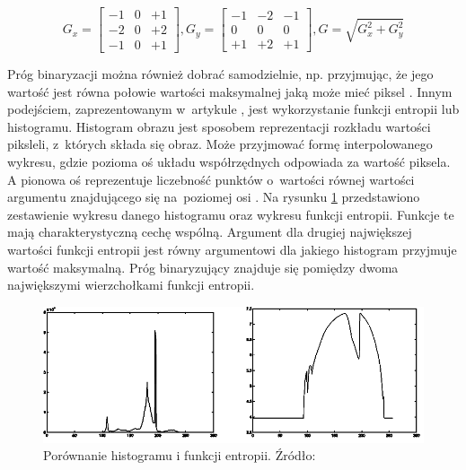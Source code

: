 \begin{equation}
G_{x} = \begin{bmatrix} -1 & 0 & +1 \\ -2 & 0 & +2 \\ -1 & 0 & +1 \end{bmatrix}, G_{y} = \begin{bmatrix} -1 & -2 & -1 \\ 0 & 0 & 0 \\ +1 & +2 & +1 \end{bmatrix},
G = \sqrt{ G_{x}^{2} + G_{y}^{2} } \label{eq:1}
\end{equation}

Próg binaryzacji można również dobrać samodzielnie, np. przyjmując, że jego wartość jest równa połowie wartości maksymalnej jaką może mieć piksel \cite{1}. Innym podejściem, zaprezentowanym w~artykule \cite{2}, jest wykorzystanie funkcji entropii lub histogramu.
Histogram obrazu jest sposobem reprezentacji rozkładu wartości piksleli, z~których składa się obraz. 
Może przyjmować formę interpolowanego wykresu, gdzie pozioma oś układu współrzędnych odpowiada za wartość piksela. 
A pionowa oś reprezentuje liczebność punktów o~wartości równej wartości argumentu znajdującego się na~poziomej osi \cite{histogram}.
Na rysunku \ref{fig:entr_hist} przedstawiono zestawienie wykresu danego histogramu oraz wykresu funkcji entropii. 
Funkcje te mają charakterystyczną cechę wspólną. 
Argument dla drugiej największej wartości funkcji entropii jest równy argumentowi dla jakiego histogram przyjmuje wartość maksymalną. Próg binaryzujący znajduje się pomiędzy dwoma największymi wierzchołkami funkcji entropii.

\begin{figure}[h]
	\includegraphics[scale=0.8]{Entropia.png}
	\caption{Porównanie histogramu i funkcji entropii. Źródło: \cite{2}}
	\label{fig:entr_hist}
\end{figure}

